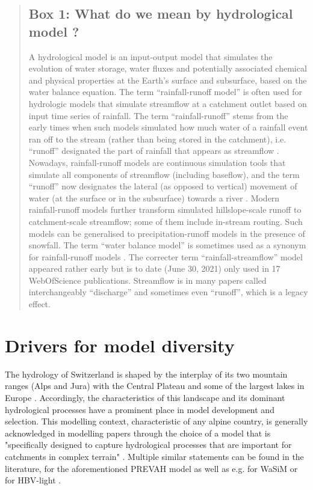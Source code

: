 \documentclass[10pt,a4paper]{article}
\begin{document}
\begin{quote}
\subsection*{Box 1: What do we mean by hydrological model ?}
\label{box:1}

A hydrological model is an input-output model that simulates the evolution of water storage, water fluxes and potentially associated chemical and physical properties at the Earth's surface and subsurface, based on the water balance equation. The term ``rainfall-runoff model'' is often used for hydrologic models that simulate streamflow at a catchment outlet based on input time series of rainfall. The term ``rainfall-runoff'' stems from the early times when such models simulated how much water of a rainfall event ran off to the stream (rather than being stored in the catchment), i.e. ``runoff'' designated the part of rainfall that appears as streamflow \citep{WMO1992}. Nowadays, rainfall-runoff models are continuous simulation tools that simulate all components of streamflow (including baseflow), and the term ``runoff'' now designates the lateral (as opposed to vertical) movement of water (at the surface or in the subsurface) towards a river \citep{WMO2012}. Modern rainfall-runoff models further transform simulated hillslope-scale runoff to catchment-scale streamflow; some of them include in-stream routing. Such models can be generalised to precipitation-runoff models in the presence of snowfall. The term ``water balance model'' is sometimes used as a synonym for rainfall-runoff models \citep{Boughton2004}. The correcter term ``rainfall-streamflow'' model appeared rather early \citep{Young1991} but is to date (June 30, 2021) only used in 17 WebOfScience publications. Streamflow is in many papers called interchangeably ``discharge'' and sometimes even ``runoff'', which is a legacy effect.  \end{quote}


\section{Drivers for model diversity}
\label{sec:context}

The hydrology of Switzerland is shaped by the interplay of its two mountain ranges (Alps and Jura) with the Central Plateau and some of the largest lakes in Europe \citep{Michel2020}. Accordingly, the characteristics of this landscape and its dominant hydrological processes have a prominent place in model development and selection. This modelling context, characteristic of any alpine country, is generally acknowledged in modelling papers through the choice of a model that is "specifically designed to capture hydrological processes that are important for catchments in complex terrain" \citep[][refering to the PREVAH model]{Anghileri2019}. Multiple similar statements can be found in the literature, for the aforementioned PREVAH model \citep{Verbunt2007, Zappa2007a, Koplin2010,  Brunner2019e} as well as e.g. for WaSiM \citep{Jasper2002, Jasper2003, Thornton2021} or for HBV-light \citep{SikorskaSenoner2020}. 
\end{document}
